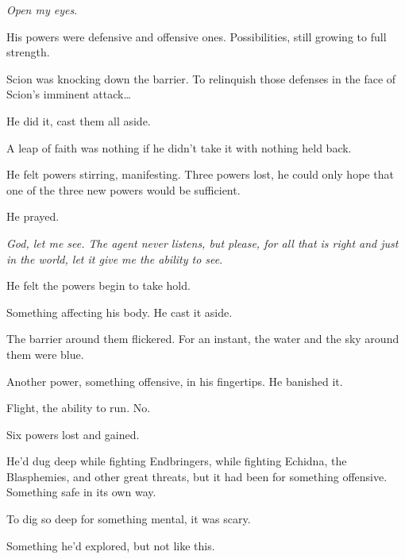 \emph{Open my eyes}.



His powers were defensive and offensive ones.  Possibilities, still growing to full strength.



Scion was knocking down the barrier.  To relinquish those defenses in the face of Scion's imminent attack\ldots



He did it, cast them all aside.



A leap of faith was nothing if he didn't take it with nothing held back.



He felt powers stirring, manifesting.  Three powers lost, he could only hope that one of the three new powers would be sufficient.



He prayed.



\emph{God, let me see.  The agent never listens, but please, for all that is right and just in the world, let it give me the ability to see}.



He felt the powers begin to take hold.



Something affecting his body.  He cast it aside.



The barrier around them flickered.  For an instant, the water and the sky around them were blue.



Another power, something offensive, in his fingertips.  He banished it.



Flight, the ability to run.  No.



Six powers lost and gained.



He'd dug deep while fighting Endbringers, while fighting Echidna, the Blasphemies, and other great threats, but it had been for something offensive.  Something safe in its own way.



To dig so deep for something mental, it was scary.



Something he'd explored, but not like this.



